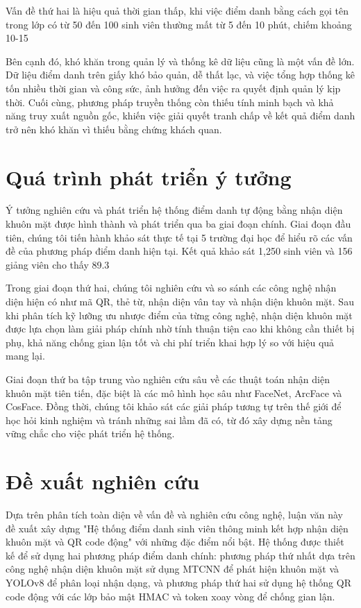 \documentclass[12pt,a4paper]{report}
\begin{document}
Vấn đề thứ hai là hiệu quả thời gian thấp, khi việc điểm danh bằng cách gọi tên trong lớp có từ 50 đến 100 sinh viên thường mất từ 5 đến 10 phút, chiếm khoảng 10-15%

Bên cạnh đó, khó khăn trong quản lý và thống kê dữ liệu cũng là một vấn đề lớn. Dữ liệu điểm danh trên giấy khó bảo quản, dễ thất lạc, và việc tổng hợp thống kê tốn nhiều thời gian và công sức, ảnh hưởng đến việc ra quyết định quản lý kịp thời. Cuối cùng, phương pháp truyền thống còn thiếu tính minh bạch và khả năng truy xuất nguồn gốc, khiến việc giải quyết tranh chấp về kết quả điểm danh trở nên khó khăn vì thiếu bằng chứng khách quan.

\section{Quá trình phát triển ý tưởng}
Ý tưởng nghiên cứu và phát triển hệ thống điểm danh tự động bằng nhận diện khuôn mặt được hình thành và phát triển qua ba giai đoạn chính. Giai đoạn đầu tiên, chúng tôi tiến hành khảo sát thực tế tại 5 trường đại học để hiểu rõ các vấn đề của phương pháp điểm danh hiện tại. Kết quả khảo sát 1,250 sinh viên và 156 giảng viên cho thấy 89.3%

Trong giai đoạn thứ hai, chúng tôi nghiên cứu và so sánh các công nghệ nhận diện hiện có như mã QR, thẻ từ, nhận diện vân tay và nhận diện khuôn mặt. Sau khi phân tích kỹ lưỡng ưu nhược điểm của từng công nghệ, nhận diện khuôn mặt được lựa chọn làm giải pháp chính nhờ tính thuận tiện cao khi không cần thiết bị phụ, khả năng chống gian lận tốt và chi phí triển khai hợp lý so với hiệu quả mang lại.

Giai đoạn thứ ba tập trung vào nghiên cứu sâu về các thuật toán nhận diện khuôn mặt tiên tiến, đặc biệt là các mô hình học sâu như FaceNet, ArcFace và CosFace. Đồng thời, chúng tôi khảo sát các giải pháp tương tự trên thế giới để học hỏi kinh nghiệm và tránh những sai lầm đã có, từ đó xây dựng nền tảng vững chắc cho việc phát triển hệ thống.

\section{Đề xuất nghiên cứu}
Dựa trên phân tích toàn diện về vấn đề và nghiên cứu công nghệ, luận văn này đề xuất xây dựng "Hệ thống điểm danh sinh viên thông minh kết hợp nhận diện khuôn mặt và QR code động" với những đặc điểm nổi bật. Hệ thống được thiết kế để sử dụng hai phương pháp điểm danh chính: phương pháp thứ nhất dựa trên công nghệ nhận diện khuôn mặt sử dụng MTCNN để phát hiện khuôn mặt và YOLOv8 để phân loại nhận dạng, và phương pháp thứ hai sử dụng hệ thống QR code động với các lớp bảo mật HMAC và token xoay vòng để chống gian lận.
\end{document}
